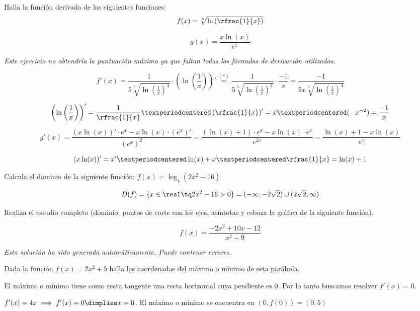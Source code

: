 \documentclass[palatino,nosec,nochap]{Docencia}
\begin{document}
\begin{problem}

Halla la función derivada de las siguientes funciones:
\ppart \[f(x) = \sqrt[5]{\ln\left(\rfrac{1}{x}\right)}\]

\ppart \[g(x) = \frac{x\ln(x)}{e^x}\]

\solution

\textit{Este ejercicio no obtendría la puntuación máxima ya que faltan todas las fórmulas de derivación utilizadas.}

\spart 
\[
f'(x) = \frac{1}{5\sqrt[5]{\ln\left(\frac{1}{x}\right)^4}}·\left(\ln\left(\frac{1}{x}\right)\right)' \overset{(*)}{=}\frac{1}{5\sqrt[5]{\ln\left(\frac{1}{x}\right)^4}}·\frac{-1}{x} = \frac{-1}{5x\sqrt[5]{\ln\left(\frac{1}{x}\right)^4}}
\]

\[
\left(\ln\left(\frac{1}{x}\right)\right)' = \frac{1}{\rfrac{1}{x}}·\left(\rfrac{1}{x}\right)' = x·(-x^{-2}) = \frac{-1}{x}
\]

\spart 
\[
g'(x) = \frac{(x\ln(x))'·e^x - x\ln(x)·(e^x)'}{(e^x)^2} = \frac{(\ln(x) +1)·e^x - x\ln(x)·e^x}{e^{2x}} = \frac{\ln(x) +1 - x\ln(x)}{e^{x}}
\]

\[
(x\ln(x))' = x'·\ln(x) + x·\rfrac{1}{x} = \ln(x) + 1
\]

\end{problem}




\begin{problem}
Calcula el dominio de la siguiente función: $f(x) = \log_4(2x^2-16)$
\solution

\[D(f) = \{x\in\real \tq 2x^2-16 > 0\} = (-\infty,-2\sqrt{2}) \cup (2\sqrt{2},\infty)\]

\end{problem}

\begin{problem}
Realiza el estudio completo (dominio, puntos de corte con los ejes, asíntotas y esboza la gráfica de la siguiente función).

\[
f(x) = \frac{-2x^2+10x-12}{x^2-9}
\]
\solution

\textit{Esta solución ha sido generada automáticamente. Puede contener errores.}

\end{problem}

\begin{problem}
Dada la función $f(x) = 2x^2+5$ halla las coordenadas del máximo o mínimo de esta parábola.
\solution

El máximo o mínimo tiene como recta tangente una recta horizontal cuya pendiente es 0. Por lo tanto buscamos resolver $f'(x) = 0$.

$f'(x) = 4x \implies f'(x) = 0 \dimplies x=0$. El máximo o mínimo se encuentra en $(0,f(0)) = (0,5)$


\end{problem}
\end{document}
